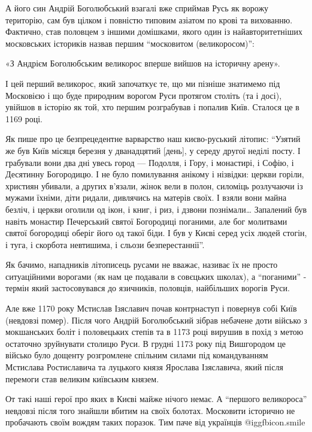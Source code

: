 А його син Андрій Боголюбський взагалі вже сприймав Русь як ворожу територію,
сам був цілком і повністю типовим азіатом по крові та вихованню. Фактично, став
половцем з іншими домішками, якого один із найавторитетніших московських
істориків назвав першим \enquote{московитом (великоросом)}: 

«З Андрієм Боголюбським великорос вперше вийшов на історичну арену». 

І цей перший великорос, який започаткує те, що ми пізніше знатимемо під
Московією і що буде природним ворогом Руси протягом століть (та і досі),
увійшов в історію як той, хто першим розграбував і попалив Київ. Сталося це в
1169 році.

Як пише про це безпрецедентне варварство наш києво-руський літопис: \enquote{Узятий же
був Київ місяця березня у дванадцятий [день], у середу другої неділі посту. І
грабували вони два дні увесь город — Подолля, і Гору, і монастирі, і Софію, і
Десятинну Богородицю. І не було помилування анікому і нізвідки: церкви горіли,
християн убивали, а других в’язали, жінок вели в полон, силоміць розлучаючи із
мужами їхніми, діти ридали, дивлячись на матерів своїх. І взяли вони майна
безліч, і церкви оголили од ікон, і книг, і риз, і дзвони познімали… Запалений
був навіть монастир Печерський святої Богородиці поганими, але бог молитвами
святої богородиці оберіг його од такої біди. І був у Києві серед усіх людей
стогін, і туга, і скорбота невтишима, і сльози безперестаннії}. 

Як бачимо, нападників літописець русами не вважає, називає їх не просто
ситуаційними ворогами (як нам це подавали в совєцьких школах), а
\enquote{поганими} - термін який застосовувався до язичників, половців,
найбільших ворогів Руси. 

Але вже 1170 року Мстислав Ізяславич почав контрнаступ і повернув собі Київ
(невдовзі помер). Після чого Андрій Боголюбський зібрав небачене доти військо з
мокшанських боліт і половецьких степів та в 1173 році вирушив в похід з метою
остаточно зруйнувати столицю Руси. В грудні 1173 року під Вишгородом це військо
було дощенту розгромлене спільним силами під командуванням Мстислава
Ростиславича та луцького князя Ярослава Ізяславича, який після перемоги став
великим київським князем. 

От такі наші герої про яких в Києві майже нічого немає. А \enquote{першого
великороса} невдовзі після того знайшли вбитим на своїх болотах. Московити
історично не пробачають своїм вождям таких поразок. Тим паче від українців  @igg{fbicon.smile}   

